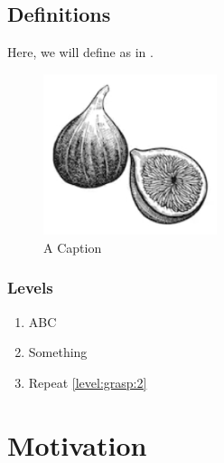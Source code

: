 \documentclass[lettersize,journal]{IEEEtran}
\begin{document}
\subsection{Definitions}
Here, we will define \cite{FrictionPreferredGrasp} as in .
\begin{figure}[h]
    \centering
    \includegraphics[width=2in]{Figs/fig1}
    \caption{A Caption}
    \label{fig:1}
\end{figure}

\subsubsection{Levels}
\begin{enumerate}[label=\textbf{Level.\arabic*}]
    \item ABC \label{level:grasp:1}
    \item Something\label{level:grasp:2} 
    \item Repeat \label{level:grasp:3} \ref{level:grasp:2}
\end{enumerate}


\section{Motivation}
\noindent 


\end{document}

